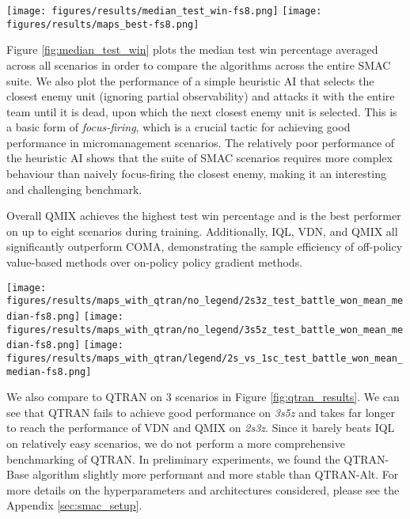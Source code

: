 \documentclass[twoside,11pt]{article}
\begin{document}
\begin{figure*}[h!]
	\centering
	\texttt{[image: figures/results/median\_test\_win-fs8.png]}
	\texttt{[image: figures/results/maps\_best-fs8.png]}
	\caption{Left: The median test win \%, averaged across all 14 scenarios. Heuristic's performance is shown as a dotted line. Right: The number of scenarios in which the algorithm's median test win \% is the highest by at least  (smoothed).}
	\label{fig:median_test_win}
\end{figure*}

Figure \ref{fig:median_test_win} plots the median test win percentage averaged across all scenarios in order to compare the algorithms across the entire SMAC suite. 
We also plot the performance of a simple heuristic AI that selects the closest enemy unit (ignoring partial observability) and attacks it with the entire team until it is dead, upon which the next closest enemy unit is selected. This is a basic form of \textit{focus-firing}, which is a crucial tactic for achieving good performance in micromanagement scenarios.
The relatively poor performance of the heuristic AI shows that the suite of SMAC scenarios requires more complex behaviour than naively focus-firing the closest enemy, making it an interesting and challenging benchmark.

Overall QMIX achieves the highest test win percentage and is the best performer on up to eight scenarios during training. 
Additionally, IQL, VDN, and QMIX all significantly outperform COMA, demonstrating the sample efficiency of off-policy value-based methods over on-policy policy gradient methods. 

\begin{figure*}[h!]
	\centering
	\texttt{[image: figures/results/maps\_with\_qtran/no\_legend/2s3z\_test\_battle\_won\_mean\_median-fs8.png]}
	\texttt{[image: figures/results/maps\_with\_qtran/no\_legend/3s5z\_test\_battle\_won\_mean\_median-fs8.png]}
	\texttt{[image: figures/results/maps\_with\_qtran/legend/2s\_vs\_1sc\_test\_battle\_won\_mean\_median-fs8.png]}
	\caption{Three scenarios including QTRAN.}
	\label{fig:qtran_results}
\end{figure*}

We also compare to QTRAN on 3 scenarios in Figure \ref{fig:qtran_results}. 
We can see that QTRAN fails to achieve good performance on \textit{3s5z} and takes far longer to reach the performance of VDN and QMIX on \textit{2s3z}. 
Since it barely beats IQL on relatively easy scenarios, we do not perform a more comprehensive benchmarking of QTRAN.
In preliminary experiments, we found the QTRAN-Base algorithm slightly more performant and more stable than QTRAN-Alt. 
For more details on the hyperparameters and architectures considered, please see the Appendix \ref{sec:smac_setup}. 
\end{document}
